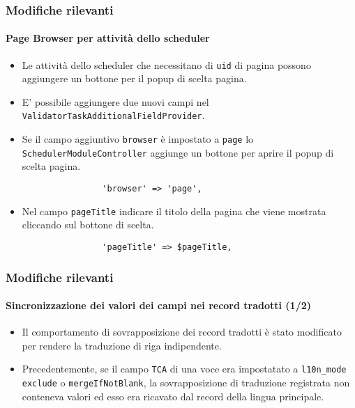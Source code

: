 \begin{frame}[fragile]
	\frametitle{Modifiche rilevanti}
	\framesubtitle{Page Browser per attività dello scheduler}

	\begin{itemize}
		\item Le attività dello scheduler che necessitano di \texttt{uid} di pagina possono aggiungere un bottone per il popup di scelta pagina.

		\item E' possibile aggiungere due nuovi campi nel \texttt{ValidatorTaskAdditionalFieldProvider}.

		\item Se il campo aggiuntivo \texttt{browser} è impostato a \texttt{page} lo
			\texttt{SchedulerModuleController} aggiunge un bottone per aprire il popup di scelta pagina.

			\begin{lstlisting}
				'browser' => 'page',
			\end{lstlisting}

		\item Nel campo \texttt{pageTitle} indicare il titolo della pagina che viene mostrata cliccando sul bottone di scelta.

			\begin{lstlisting}
				'pageTitle' => $pageTitle,
			\end{lstlisting}

	\end{itemize}

\end{frame}


\begin{frame}[fragile]
	\frametitle{Modifiche rilevanti}
	\framesubtitle{Sincronizzazione dei valori dei campi nei record tradotti (1/2)}

	\lstset{basicstyle=\tiny\ttfamily}

	\begin{itemize}
		\item Il comportamento di sovrapposizione dei record tradotti è stato modificato per rendere la traduzione di riga indipendente.

		\item Precedentemente, se il campo \texttt{TCA} di una voce era impostatato a \texttt{l10n\_mode} \texttt{exclude} o
			\texttt{mergeIfNotBlank}, la sovrapposizione di traduzione registrata non conteneva valori ed esso era ricavato dal record della lingua principale.

	\end{itemize}

\end{frame}

